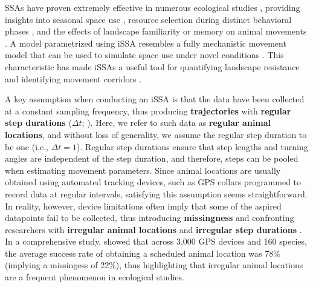 \documentclass[../FinalThesis.tex]{subfiles}
\begin{document}
SSAs have proven extremely effective in numerous ecological studies
\citep{Thurfjell.2014}, providing insights into seasonal space use
\citep{Vales.2022, Enns.2023}, resource selection during distinct behavioral
phases \citep{Elliot.2014, Abrahms.2017, Cozzi.2018, Broekhuis.2019}, and the
effects of landscape familiarity or memory on animal movements \citep{Kim.2023}.
A model parametrized using iSSA resembles a fully mechanistic movement model
that can be used to simulate space use under novel conditions \citep{Avgar.2016,
Signer.2017, Hofmann.2023, Signer.2024}. This characteristic has made iSSAs a
useful tool for quantifying landscape resistance and identifying movement
corridors \citep{Zeller.2020, Buchholtz.2020, Hofmann.2021, Hofmann.2023}.

A key assumption when conducting an iSSA is that the data have been collected at
a constant sampling frequency, thus producing \textbf{trajectories} with
\textbf{regular step durations} ($\Delta t$; \citealp{Fortin.2005,
Thurfjell.2014}). Here, we refer to such data as \textbf{regular animal
locations}, and without loss of generality, we assume the regular step duration
to be one (i.e., $\Delta t = 1$). Regular step durations ensure that
step lengths and turning angles are independent of the step duration, and
therefore, steps can be pooled when estimating movement parameters.
Since animal locations are usually obtained using automated tracking devices,
such as GPS collars programmed to record data at regular intervals, satisfying
this assumption seems straightforward. In reality, however, device limitations
often imply that some of the aspired datapoints fail to be collected, thus
introducing \textbf{missingness} and confronting researchers with
\textbf{irregular animal locations} and \textbf{irregular step durations}
\citep{Frair.2010}. In a comprehensive study, \citet{Hofman.2019} showed that
across 3,000 GPS devices and 160 species, the average success rate of obtaining
a scheduled animal location was 78\% (implying a missingess of 22\%), thus
highlighting that irregular animal locations are a frequent phenomenon in
ecological studies.
\end{document}
